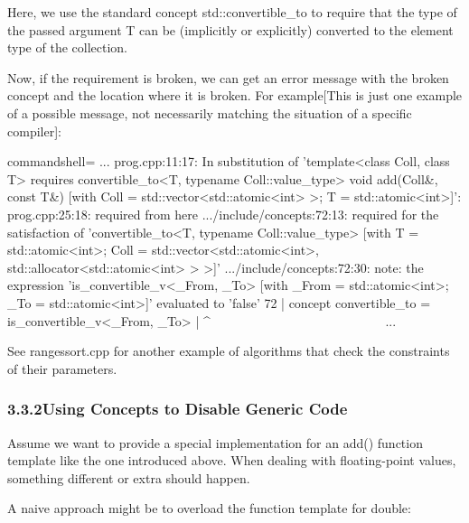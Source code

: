 Here, we use the standard concept std::convertible\_to to require that the type of the passed argument T can be (implicitly or explicitly) converted to the element type of the collection.

Now, if the requirement is broken, we can get an error message with the broken concept and the location where it is broken. For example[This is just one example of a possible message, not necessarily matching the situation of a specific compiler]:

{\footnotesize
\begin{tcblisting}{commandshell={}}
...
prog.cpp:11:17: In substitution of ’template<class Coll, class T>
                 requires convertible_to<T, typename Coll::value_type>
                 void add(Coll&, const T&)
                [with Coll = std::vector<std::atomic<int> >; T = std::atomic<int>]’:
prog.cpp:25:18: required from here
.../include/concepts:72:13: required for the satisfaction of
                 ’convertible_to<T, typename Coll::value_type>
                  [with T = std::atomic<int>;
                      Coll = std::vector<std::atomic<int>,
                                              std::allocator<std::atomic<int> > >]’
.../include/concepts:72:30: note: the expression ’is_convertible_v<_From, _To>
                      [with _From = std::atomic<int>; _To = std::atomic<int>]’
                      evaluated to ’false’
    72 | concept convertible_to = is_convertible_v<_From, _To>
        |                                    ^~~~~~~~~~~~~~~~~~~~~~~~~~~~
...
\end{tcblisting}
}

See rangessort.cpp for another example of algorithms that check the constraints of their parameters.

\subsubsection*{ 3.3.2\hspace{0.2cm}Using Concepts to Disable Generic Code}

Assume we want to provide a special implementation for an add() function template like the one introduced above. When dealing with floating-point values, something different or extra should happen.

A naive approach might be to overload the function template for double:

